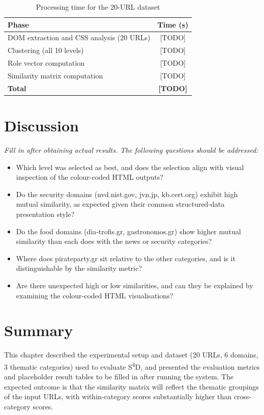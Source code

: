 \begin{table}[htbp]
\centering
\caption{Processing time for the 20-URL dataset}
\label{tab:processing-time}
\begin{tabular}{lc}
\toprule
\textbf{Phase} & \textbf{Time (s)} \\
\midrule
DOM extraction and CSS analysis (20 URLs) & [TODO] \\
Clustering (all 10 levels)                & [TODO] \\
Role vector computation                   & [TODO] \\
Similarity matrix computation             & [TODO] \\
\midrule
\textbf{Total}                            & \textbf{[TODO]} \\
\bottomrule
\end{tabular}
\end{table}

\section{Discussion}
\label{sec:discussion}

\textit{Fill in after obtaining actual results. The following questions should be addressed:}

\begin{itemize}
    \item Which level was selected as best, and does the selection align with visual inspection of the colour-coded HTML outputs?
    \item Do the security domains (nvd.nist.gov, jvn.jp, kb.cert.org) exhibit high mutual similarity, as expected given their common structured-data presentation style?
    \item Do the food domains (dia-trofis.gr, gastronomos.gr) show higher mutual similarity than each does with the news or security categories?
    \item Where does pirateparty.gr sit relative to the other categories, and is it distinguishable by the similarity metric?
    \item Are there unexpected high or low similarities, and can they be explained by examining the colour-coded HTML visualisations?
\end{itemize}

\section{Summary}
\label{sec:ch5-summary}

This chapter described the experimental setup and dataset (20 URLs, 6 domains, 3 thematic categories) used to evaluate S\textsuperscript{4}D, and presented the evaluation metrics and placeholder result tables to be filled in after running the system. The expected outcome is that the similarity matrix will reflect the thematic groupings of the input URLs, with within-category scores substantially higher than cross-category scores.
